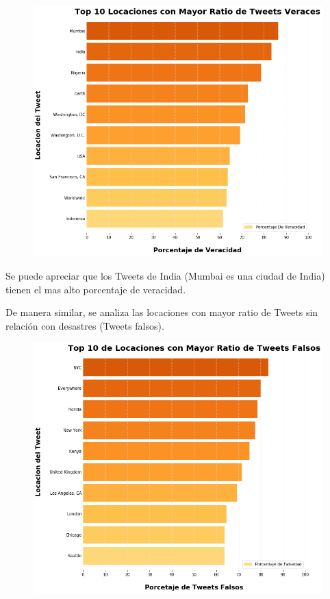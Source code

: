 \documentclass[titlepage,a4paper]{article}
\begin{document}
    \begin{figure}[H]
    \centering
    \includegraphics[width=1\textwidth]{graficos/Analisis de Locacion/top_10_locaciones_con_mayor_ratio_de_tweets_veraces.png}
    \caption{} 
    \end{figure}
    
    Se puede apreciar que los Tweets de India (Mumbai es una ciudad de India) tienen el mas alto porcentaje de veracidad. 
    
    De manera similar, se analiza las locaciones con mayor ratio de Tweets sin relación con desastres (Tweets falsos). 
    
    \begin{figure}[H]
    \centering
    \includegraphics[width=1\textwidth]{graficos/Analisis de Locacion/top_10_locaciones_con_mayor_ratio_de_tweets_falsos.png}
    \caption{}
    \end{figure}
    
\end{document}
